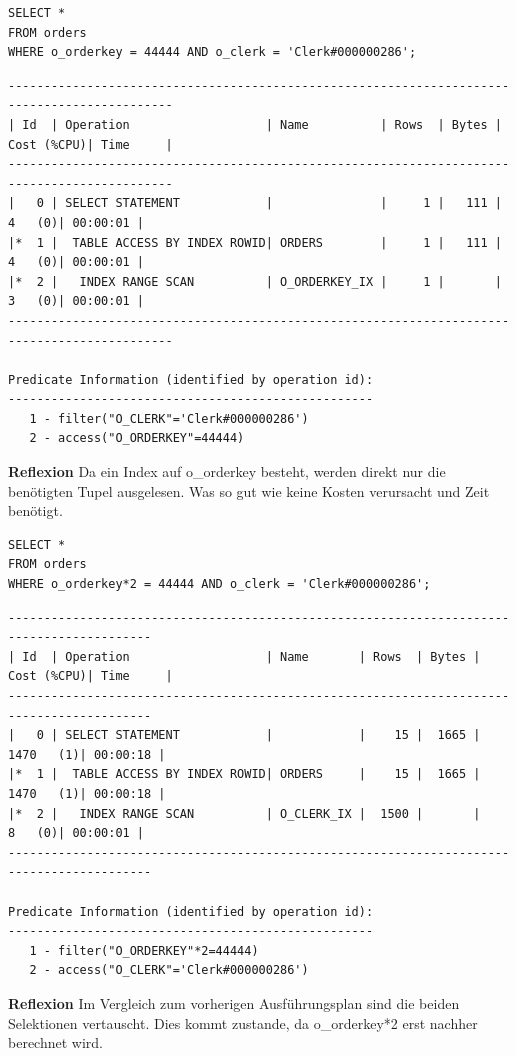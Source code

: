 \documentclass[10pt]{article}
\begin{document}
\begin{lstlisting}[style=sql]
SELECT *
FROM orders
WHERE o_orderkey = 44444 AND o_clerk = 'Clerk#000000286';
\end{lstlisting}
\begin{lstlisting}[style=queryexecutionplan]
---------------------------------------------------------------------------------------------
| Id  | Operation                   | Name          | Rows  | Bytes | Cost (%CPU)| Time     |
---------------------------------------------------------------------------------------------
|   0 | SELECT STATEMENT            |               |     1 |   111 |     4   (0)| 00:00:01 |
|*  1 |  TABLE ACCESS BY INDEX ROWID| ORDERS        |     1 |   111 |     4   (0)| 00:00:01 |
|*  2 |   INDEX RANGE SCAN          | O_ORDERKEY_IX |     1 |       |     3   (0)| 00:00:01 |
---------------------------------------------------------------------------------------------

Predicate Information (identified by operation id):
---------------------------------------------------
   1 - filter("O_CLERK"='Clerk#000000286')
   2 - access("O_ORDERKEY"=44444)
\end{lstlisting}
\textbf{Reflexion} \newline
Da ein Index auf o\_orderkey besteht, werden direkt nur die benötigten Tupel ausgelesen. Was so 
gut wie keine Kosten verursacht und Zeit benötigt.
\newpage
\begin{lstlisting}[style=sql]
SELECT *
FROM orders
WHERE o_orderkey*2 = 44444 AND o_clerk = 'Clerk#000000286';
\end{lstlisting}
\begin{lstlisting}[style=queryexecutionplan]
------------------------------------------------------------------------------------------
| Id  | Operation                   | Name       | Rows  | Bytes | Cost (%CPU)| Time     |
------------------------------------------------------------------------------------------
|   0 | SELECT STATEMENT            |            |    15 |  1665 |  1470   (1)| 00:00:18 |
|*  1 |  TABLE ACCESS BY INDEX ROWID| ORDERS     |    15 |  1665 |  1470   (1)| 00:00:18 |
|*  2 |   INDEX RANGE SCAN          | O_CLERK_IX |  1500 |       |     8   (0)| 00:00:01 |
------------------------------------------------------------------------------------------

Predicate Information (identified by operation id):
---------------------------------------------------
   1 - filter("O_ORDERKEY"*2=44444)
   2 - access("O_CLERK"='Clerk#000000286')
\end{lstlisting}
\textbf{Reflexion} \newline
Im Vergleich zum vorherigen Ausführungsplan sind die beiden Selektionen vertauscht. Dies kommt zustande, 
da o\_orderkey*2 erst nachher berechnet wird.
\end{document}
